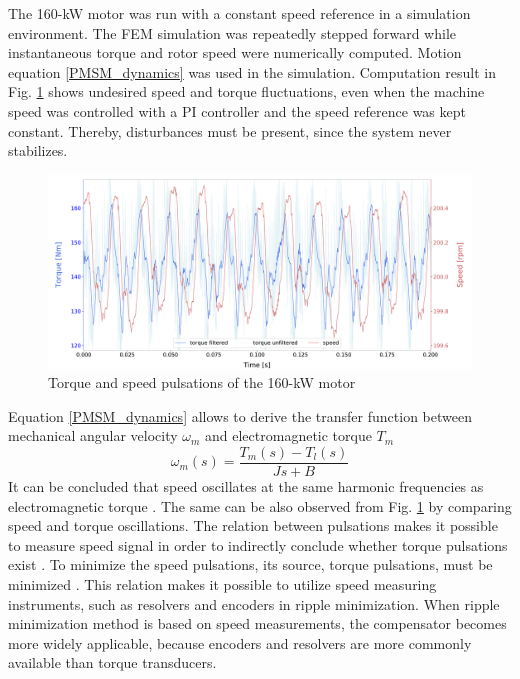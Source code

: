 The 160-kW motor was run with a constant speed reference in a simulation environment. The FEM simulation was repeatedly stepped forward while instantaneous torque and rotor speed were numerically computed. Motion equation \eqref{PMSM_dynamics} was used in the simulation. Computation result in Fig. \ref{SDM_speed_torque} shows undesired speed and torque fluctuations, even when the machine speed was controlled with a PI controller and the speed reference was kept constant. Thereby, disturbances must be present, since the system never stabilizes.
\begin{figure}[htb]
    \centering
    \includegraphics[width=1\linewidth]{images/torque-speed-pulsations.pdf}
    \caption{Torque and speed pulsations of the 160-kW motor}
    \label{SDM_speed_torque} 
\end{figure}



Equation \eqref{PMSM_dynamics} allows to derive the transfer function between mechanical angular velocity $\omega_m$ and electromagnetic torque $T_m$
\begin{equation}
    \omega_m(s) = \frac{T_m(s) - T_l(s)}{Js + B}
    \label{Eq:transfer_function}
\end{equation}
It can be concluded that speed oscillates at the same harmonic frequencies as electromagnetic torque \cite{ILC:2005, ILC:2018}. The same can be also observed from Fig. \ref{SDM_speed_torque} by comparing speed and torque oscillations. The relation between pulsations makes it possible to measure speed signal in order to indirectly conclude whether torque pulsations exist \cite{ILC:2005}. To minimize the speed pulsations, its source, torque pulsations, must be minimized \cite{ILC:2004, ILC:2018}. This relation makes it possible to utilize speed measuring instruments, such as resolvers and encoders in ripple minimization. When ripple minimization method is based on speed measurements, the compensator becomes more widely applicable, because encoders and resolvers are more commonly available than torque transducers.

